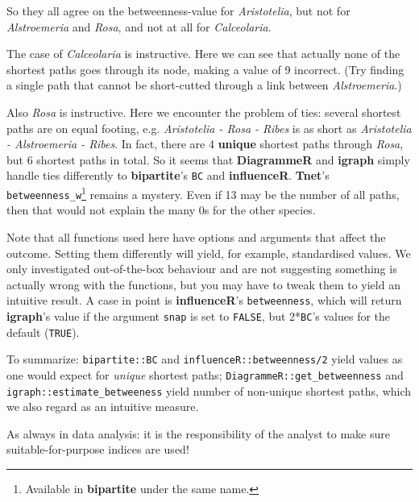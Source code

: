 \documentclass[a4paper, 11pt]{article}\usepackage[]{graphicx}\usepackage[]{color}
\newcommand{\package}[1]{\textbf{#1}}
\newcommand{\code}[1]{\texttt{#1}}
\begin{document}
So they all agree on the betweenness-value for \emph{Aristotelia}, but not for \emph{Alstroemeria} and \emph{Rosa}, and not at all for \emph{Calceolaria}. 

The case of \emph{Calceolaria} is instructive. Here we can see that actually none of the shortest paths goes through its node, making a value of 9 incorrect. (Try finding a single path that cannot be short-cutted through a link between \emph{Alstroemeria}.)

Also \emph{Rosa} is instructive. Here we encounter the problem of ties: several shortest paths are on equal footing, e.g. \emph{Aristotelia - Rosa - Ribes} is as short as \emph{Aristotelia - Alstroemeria - Ribes}. In fact, there are 4 \textbf{unique} shortest paths through \emph{Rosa}, but 6 shortest paths in total. So it seems that \package{DiagrammeR} and \package{igraph} simply handle ties differently to \package{bipartite}'s \code{BC} and \package{influenceR}. \package{Tnet}'s \code{betweenness\_w}\footnote{Available in \package{bipartite} under the same name.} remains a mystery. Even if 13 may be the number of all paths, then that would not explain the many 0s for the other species.

Note that all functions used here have options and arguments that affect the outcome. Setting them differently will yield, for example, standardised values. We only investigated out-of-the-box behaviour and are not suggesting something is actually wrong with the functions, but you may have to tweak them to yield an intuitive result. A case in point is \package{influenceR}'s \code{betweenness}, which will return \package{igraph}'s value if the argument \texttt{snap} is set to \code{FALSE}, but 2*\code{BC}'s values for the default (\code{TRUE}).

To summarize: \code{bipartite::BC} and \code{influenceR::betweenness/2} yield values as one would expect for \emph{unique} shortest paths; \code{DiagrammeR::get\_betweenness} and \code{igraph::estimate\_betweeness} yield number of non-unique shortest paths, which we also regard as an intuitive measure. 

As always in data analysis: it is the responsibility of the analyst to make sure suitable-for-purpose indices are used!
\end{document}
